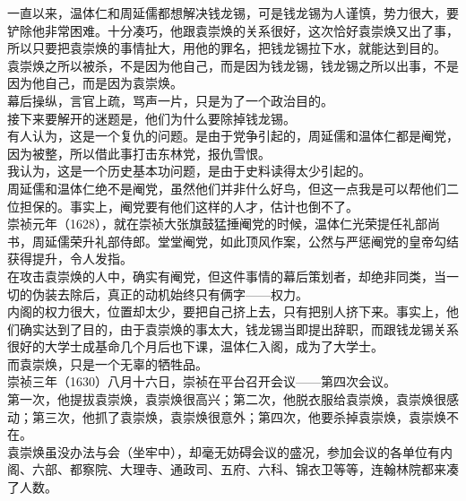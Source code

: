 \begin{multicols}{\theparacolNo}
一直以来，温体仁和周延儒都想解决钱龙锡，可是钱龙锡为人谨慎，势力很大，要铲除他非常困难。十分凑巧，他跟袁崇焕的关系很好，这次恰好袁崇焕又出了事，所以只要把袁崇焕的事情扯大，用他的罪名，把钱龙锡拉下水，就能达到目的。\\

袁崇焕之所以被杀，不是因为他自己，而是因为钱龙锡，钱龙锡之所以出事，不是因为他自己，而是因为袁崇焕。\\

幕后操纵，言官上疏，骂声一片，只是为了一个政治目的。\\

接下来要解开的迷题是，他们为什么要除掉钱龙锡。\\

有人认为，这是一个复仇的问题。是由于党争引起的，周延儒和温体仁都是阉党，因为被整，所以借此事打击东林党，报仇雪恨。\\

我认为，这是一个历史基本功问题，是由于史料读得太少引起的。\\

周延儒和温体仁绝不是阉党，虽然他们并非什么好鸟，但这一点我是可以帮他们二位担保的。事实上，阉党要有他们这样的人才，估计也倒不了。\\

崇祯元年（1628），就在崇祯大张旗鼓猛捶阉党的时候，温体仁光荣提任礼部尚书，周延儒荣升礼部侍郎。堂堂阉党，如此顶风作案，公然与严惩阉党的皇帝勾结获得提升，令人发指。\\

在攻击袁崇焕的人中，确实有阉党，但这件事情的幕后策划者，却绝非同类，当一切的伪装去除后，真正的动机始终只有俩字——权力。\\

内阁的权力很大，位置却太少，要把自己挤上去，只有把别人挤下来。事实上，他们确实达到了目的，由于袁崇焕的事太大，钱龙锡当即提出辞职，而跟钱龙锡关系很好的大学士成基命几个月后也下课，温体仁入阁，成为了大学士。\\

而袁崇焕，只是一个无辜的牺牲品。\\

崇祯三年（1630）八月十六日，崇祯在平台召开会议——第四次会议。\\

第一次，他提拔袁崇焕，袁崇焕很高兴；第二次，他脱衣服给袁崇焕，袁崇焕很感动；第三次，他抓了袁崇焕，袁崇焕很意外；第四次，他要杀掉袁崇焕，袁崇焕不在。\\

袁崇焕虽没办法与会（坐牢中），却毫无妨碍会议的盛况，参加会议的各单位有内阁、六部、都察院、大理寺、通政司、五府、六科、锦衣卫等等，连翰林院都来凑了人数。\\


\end{multicols}
